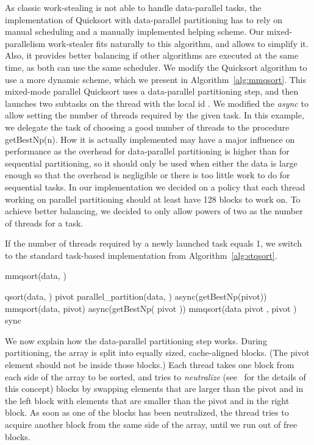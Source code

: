 \documentclass[preprint]{sigplanconf}
\begin{document}
As classic work-stealing is not able to handle data-parallel tasks,
the implementation of Quicksort with data-parallel partitioning has to
rely on manual scheduling and a manually implemented helping
scheme. Our mixed-parallelism work-stealer fits naturally to this
algorithm, and allows to simplify it. Also, it provides better
balancing if other algorithms are executed at the same time, as both
can use the same scheduler. We modify the Quicksort algorithm to use a
more dynamic scheme, which we present in
Algorithm~\ref{alg:mmqsort}. This mixed-mode parallel Quicksort uses a
data-parallel partitioning step, and then launches two subtasks on the
thread with the local id . We modified the \emph{async} to allow
setting the number of threads required by the given task. In this
example, we delegate the task of choosing a good number of threads to
the procedure getBestNp(n). How it is actually implemented may have a
major influence on performance as the overhead for data-parallel
partitioning is higher than for sequential partitioning, so it should
only be used when either the data is large enough so that the overhead
is negligible or there is too little work to do for sequential
tasks. In our implementation we decided on a policy that each thread
working on parallel partitioning should at least have 128 blocks to
work on. To achieve better balancing, we decided to only allow powers
of two as the number of threads for a task.

If the number of threads required by a newly launched task  equals
1, we switch to the standard task-based implementation from
Algorithm~\ref{alg:stqsort}.

\begin{algorithm}
\caption{mmqsort(data, )}\label{alg:mmqsort}
\begin{algorithmic}[1]
\IF {}
	\RETURN qsort(data, )
\ELSE
	\STATE pivot  parallel\_partition(data, )
		\STATE async(getBestNp(pivot)) mmqsort(data, pivot)
		\STATE async(getBestNp( pivot )) mmqsort(data  pivot ,  pivot )
		\STATE sync
	\ENDIF
\ENDIF
\end{algorithmic}
\end{algorithm}

We now explain how the data-parallel partitioning step works. During
partitioning, the array is split into equally sized, cache-aligned
blocks. (The pivot element should not be inside those blocks.) Each
thread takes one block from each side of the array to be sorted, and
tries to \emph{neutralize} (see~\cite{TsigasZhang03} for the details
of this concept) blocks by swapping elements that are larger than the
pivot and in the left block with elements that are smaller than the
pivot and in the right block. As soon as one of the blocks has been
neutralized, the thread tries to acquire another block from the same
side of the array, until we run out of free blocks.
\end{document}
